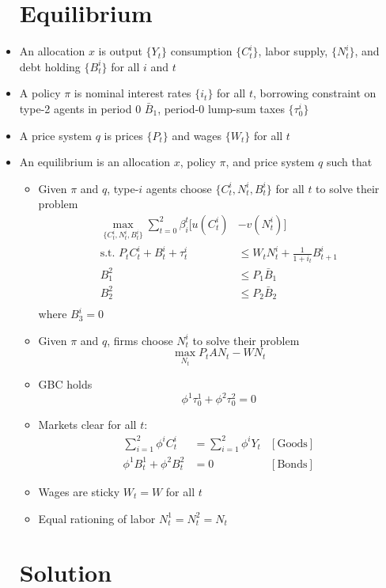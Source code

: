 \documentclass{article}
\begin{document}
\begin{itemize}
\section{Equilibrium}
\item An allocation $x$ is output $\{Y_t\}$ consumption $\{C_t^i\}$, labor supply, $\{N_t^i\}$, and debt holding $\{B_t^i\}$ for all $i$ and $t$
\item A policy $\pi$ is nominal interest rates $\{i_t\}$ for all $t$, borrowing constraint on type-2 agents in period 0 $\bar B_1$, period-0 lump-sum taxes $\{\tau^i_0\}$
\item A price system $q$ is prices $\{P_t\}$ and wages $\{W_t\}$ for all $t$
\item An equilibrium is an allocation $x$, policy $\pi$, and price system $q$ such that
\begin{itemize}
\item Given $\pi$ and $q$, type-$i$ agents choose $\{C_t^i, N_t^i, B_t^i\}$ for all $t$ to solve their problem
\begin{align*}
\max_{\{C_t^i, N_t^i, B_t^i\}} \sum_{t=0}^2 \beta_i^t [u(C_t^i) &- v(N_t^i)]\\
\text{s.t. } P_t C_t^i + B_t^i + \tau_t^i &\le W_t N_t^i + \frac{1}{1 + i_t} B_{t+1}^i\\
B_1^2 &\le P_1 \bar B_1\\
B_2^2 &\le P_2 \bar B_2\\
\end{align*}
where $B_3^i = 0$
\item Given $\pi$ and $q$, firms choose $N_t^i$ to solve their problem
$$
\max_{N_t} P_t A N_t - W N_t
$$
\item GBC holds
$$
\phi^1\tau^1_0 + \phi^2\tau^2_0 = 0
$$
\item Markets clear for all $t$:
\begin{align*}
\sum_{i=1}^2 \phi^i C_t^i &= \sum_{i=1}^2 \phi^i Y_t & [\text{Goods}]\\
\phi^1 B_t^1 + \phi^2 B_t^2 &= 0  & [\text{Bonds}]
\end{align*}
\item Wages are sticky $W_t = W$ for all $t$
\item Equal rationing of labor $N_t^1 = N_t^2 = N_t$
\end{itemize}
\section{Solution}

\end{itemize}
\end{document}
